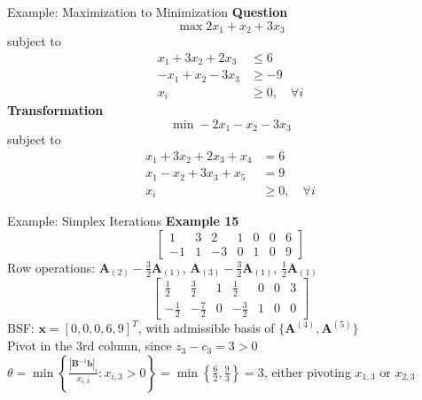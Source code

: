 \documentclass[aspectratio=169,hyperref,UTF8,CJK]{beamer}
\begin{document}
\begin{frame}{Example: Maximization to Minimization}
\textbf{Question}
\[
\max 2x_1 + x_2 + 3x_3
\]
subject to
\begin{align*}
x_1 + 3x_2 + 2x_3 & \leq 6 \\
-x_1 + x_2 - 3x_3 & \geq -9 \\
x_i & \geq 0, \quad \forall i
\end{align*}
\textbf{Transformation}
\[
\min -2x_1 - x_2 - 3x_3
\]
subject to
\begin{align*}
x_1 + 3x_2 + 2x_3 + x_4 & = 6 \\
x_1 - x_2 + 3x_3 + x_5 & = 9 \\
x_i & \geq 0, \quad \forall i
\end{align*}
\end{frame}

\begin{frame}{Example: Simplex Iterations}
\textbf{Example 15}
\[
\begin{bmatrix}
1 & 3 & 2 & 1 & 0 & 0 & 6 \\
-1 & 1 & -3 & 0 & 1 & 0 & 9
\end{bmatrix}
\]
Row operations: \(\mathbf{A}_{(2)} - \frac{3}{2}\mathbf{A}_{(1)}\), \(\mathbf{A}_{(3)} - \frac{3}{2}\mathbf{A}_{(1)}\), \(\frac{1}{2}\mathbf{A}_{(1)}\)
\[
\begin{bmatrix}
\frac{1}{2} & \frac{3}{2} & 1 & \frac{1}{2} & 0 & 0 & 3 \\
-\frac{1}{2} & -\frac{7}{2} & 0 & -\frac{3}{2} & 1 & 0 & 0
\end{bmatrix}
\]
BSF: \(\mathbf{x} = [0,0,0,6,9]^T\), with admissible basis of \(\{\mathbf{A}^{(4)},\mathbf{A}^{(5)}\}\) \\
Pivot in the 3rd column, since \(z_3 - c_3 = 3 > 0\) \\
\(\theta = \min \left\{ \frac{|\mathbf{B}^{-1}\mathbf{b}|_i}{x_{i,3}} : x_{i,3} > 0 \right\} = \min \left\{ \frac{6}{2}, \frac{9}{3} \right\} = 3\), either pivoting \(x_{1,3}\) or \(x_{2,3}\)
\end{frame}
\end{document}
